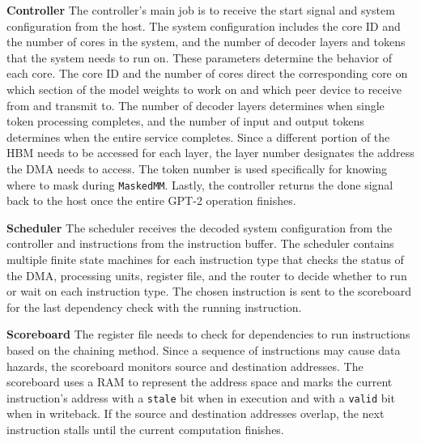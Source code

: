 \textbf{Controller}
The controller's main job is to receive the start signal and system configuration from the host. %
The system configuration includes the core ID and the number of cores in the system, and the number of decoder layers and tokens that the system needs to run on. These parameters determine the behavior of each core. 
The core ID and the number of cores direct the corresponding core on which section of the model weights to work on and which peer device to receive from and transmit to. The number of decoder layers determines when single token processing completes, and the number of input and output tokens determines when the entire service completes. Since a different portion of the HBM needs to be accessed for each layer, the layer number designates the address the DMA needs to access. 
The token number is used specifically for knowing where to mask during \texttt{MaskedMM}.
Lastly, the controller returns the done signal back to the host once the entire GPT-2 operation finishes.
 
\textbf{Scheduler}
The scheduler receives the decoded system configuration from the controller and instructions from the instruction buffer. The scheduler contains multiple finite state machines for each instruction type that checks the status of the DMA, processing units, register file, and the router to decide whether to run or wait on each instruction type. The chosen instruction is sent to the scoreboard for the last dependency check with the running instruction.

\textbf{Scoreboard}
The register file needs to check for dependencies to run instructions based on the chaining method. Since a sequence of instructions may cause data hazards, the scoreboard monitors source and destination addresses. The scoreboard uses a RAM to represent the address space and marks the current instruction's address with a \texttt{stale} bit when in execution and with a \texttt{valid} bit when in writeback. If the source and destination addresses overlap, %
the next instruction stalls until the current computation finishes. %



